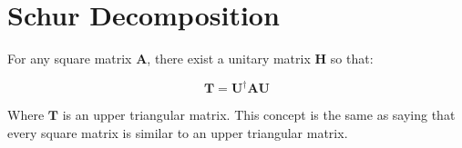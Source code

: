 \section{Schur Decomposition}

For any square matrix $\mathbf{A}$, there exist a unitary matrix $\mathbf{H}$ so that:

\begin{equation}
\mathbf{T} = \mathbf{U}^{\dagger}\mathbf{A}\mathbf{U}
\end{equation}

Where $\mathbf{T}$ is an upper triangular matrix. This concept is the same as saying that every square matrix is similar to an upper triangular matrix.
